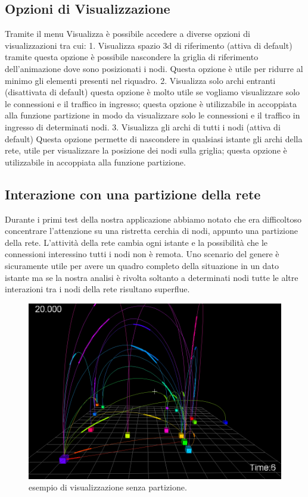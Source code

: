 \documentclass[a4paper,12pt]{article}
\begin{document}
\subsection{Opzioni di Visualizzazione}
Tramite il menu Visualizza \`e possibile accedere a diverse opzioni di visualizzazioni tra cui:
1. Visualizza spazio 3d di riferimento (attiva di default) tramite questa opzione \`e possibile nascondere la griglia di riferimento dell'animazione dove sono posizionati i nodi. Questa opzione \`e utile per ridurre al minimo gli elementi presenti nel riquadro.
2. Visualizza solo archi entranti (disattivata di default) questa opzione \`e molto utile se  vogliamo visualizzare solo le connessioni e il traffico in ingresso; questa opzione \`e utilizzabile in accoppiata alla funzione partizione in modo da visualizzare solo le connessioni e il traffico in ingresso  di determinati nodi.
3. Visualizza gli archi di tutti i nodi (attiva di default)   Questa opzione permette di nascondere in qualsiasi istante gli archi della rete, utile per visualizzare la posizione dei nodi sulla griglia; questa opzione \`e utilizzabile in accoppiata alla funzione partizione.
 
 
 
\subsection{Interazione con una partizione della rete}
Durante i primi test della nostra applicazione abbiamo notato che era difficoltoso concentrare l'attenzione su una ristretta cerchia di nodi, appunto una  partizione della rete. L'attività della rete cambia ogni istante e la possibilità che le connessioni  interessino tutti  i nodi non \`e remota. Uno scenario del genere \`e sicuramente utile per avere un quadro completo della situazione  in un dato istante ma se la nostra analisi \`e rivolta soltanto a determinati nodi tutte le altre interazioni tra i nodi della rete risultano superflue.

\begin{figure}[htb!]
 \begin{center}
  \includegraphics[width=\textwidth]{images/image2.png}
 \end{center}
 \caption{esempio di visualizzazione senza partizione.}
 \label{fig:slider}
\end{figure}
 
\end{document}
